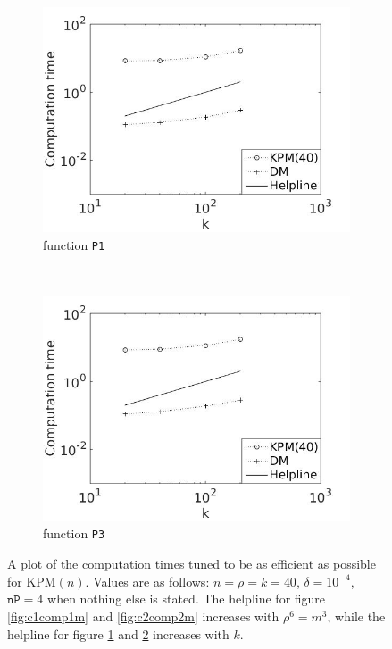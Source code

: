 \begin{figure}[H]
        \begin{subfigure}[b]{0.45\textwidth}
                \includegraphics[width=\textwidth]{fig/c3comp1k}
                \caption{function \texttt{P1}}
                \label{fig:c3comp1k}
        \end{subfigure}%
        ~
        \begin{subfigure}[b]{0.45\textwidth}
                \includegraphics[width=\textwidth]{fig/c4comp2k}
                \caption{function \texttt{P3}}
                \label{fig:c4comp2k}
        \end{subfigure}
        \caption{A plot of the computation times tuned to be as efficient as possible for KPM$(n)$. Values are as follows: $n = \rho = k = 40$, $\delta = 10^{-4}$, $\texttt{nP} = 4$ when nothing else is stated. The helpline for figure \ref{fig:c1comp1m} and \ref{fig:c2comp2m} increases with $\rho^6 = m^3$, while the helpline for figure \ref{fig:c3comp1k} and \ref{fig:c4comp2k} increases with $k$.}\label{fig:comp}
        
\end{figure}
